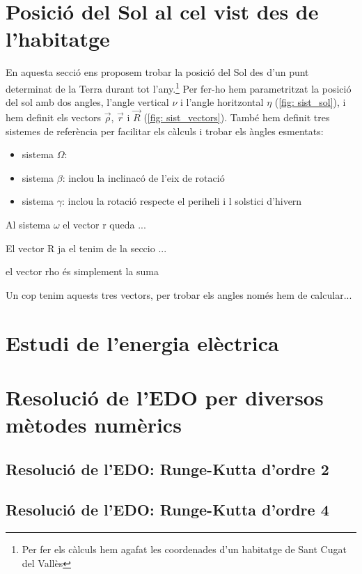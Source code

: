 \documentclass[11pt]{article}
\begin{document}
\section{Posició del Sol al cel vist des de l'habitatge} 
En aquesta secció ens proposem trobar la posició del Sol des d'un punt determinat de la Terra durant tot l'any.\footnote{Per fer els càlculs hem agafat les coordenades d'un habitatge de Sant Cugat del Vallès} Per fer-ho hem parametritzat la posició del sol amb dos angles, l'angle vertical $\nu$ i l'angle horitzontal $\eta$ (\ref{fig: sist_sol}), i hem definit els vectors $\vec{\rho}$, $\vec{r}$ i $\vec{R}$ (\ref{fig: sist_vectors}).
També hem definit tres sistemes de referència per facilitar els càlculs i trobar els àngles esmentats:
\begin{itemize}
    \item sistema $\Omega$: 
    \item sistema $\beta$: inclou la inclinacó de l'eix de rotació
    \item sistema $\gamma$: inclou la rotació respecte el periheli i l solstici d'hivern
\end{itemize}
Al sistema $\omega$ el vector r queda
... 

El vector R ja el tenim de la seccio ... 

el vector rho és simplement la suma 

Un cop tenim aquests tres vectors, per trobar els  angles només hem de calcular... 

\section{Estudi de l'energia elèctrica}

\section{Resolució de l'EDO per diversos mètodes numèrics}\label{sec: edos}

\subsection{Resolució de l'EDO: Runge-Kutta d'ordre 2}

\subsection{Resolució de l'EDO: Runge-Kutta d'ordre 4}
\end{document}
